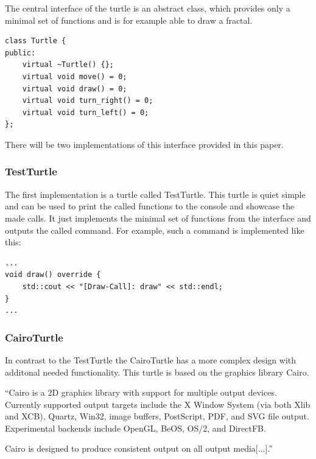 \documentclass[english]{cpp-hmwk}
\begin{document}
The central interface of the turtle is an abstract class, which provides only a minimal set of functions and is for example able to draw a fractal.

\medskip
\begin{lstlisting}
class Turtle {
public:
    virtual ~Turtle() {};
    virtual void move() = 0;
    virtual void draw() = 0;
    virtual void turn_right() = 0;
    virtual void turn_left() = 0;
};
\end{lstlisting}

\noindent There will be two implementations of this interface provided in this paper. 

\subsubsection{TestTurtle}

The first implementation is a turtle called TestTurtle. This turtle is quiet simple and can be used to print the called functions to the console and showcase the made calls.
It just implements the minimal set of functions from the interface and outputs the called command. For example, such a command is implemented like this:

\medskip
\begin{lstlisting}
...
void draw() override {
    std::cout << "[Draw-Call]: draw" << std::endl;
}
...
\end{lstlisting}

\subsubsection{CairoTurtle}
In contrast to the TestTurtle the CairoTurtle has a more complex design with additonal needed functionality. This turtle is based on the graphics library Cairo.


\noindent ``Cairo is a 2D graphics library with support for multiple output devices. Currently supported output targets include the X Window System (via both Xlib and XCB), Quartz, Win32, image buffers, PostScript, PDF, and SVG file output. Experimental backends include OpenGL, BeOS, OS/2, and DirectFB.


\noindent Cairo is designed to produce consistent output on all output media[...].''\cite[Cf.]{cairohp}
\end{document}
